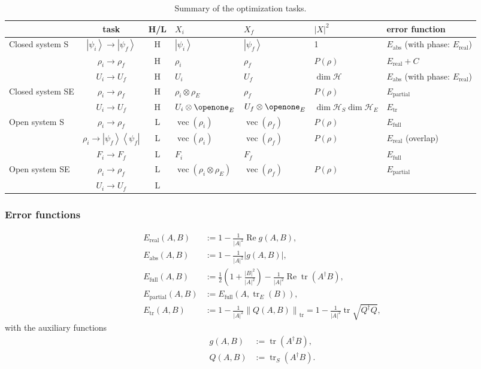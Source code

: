 \documentclass[aps, pra, a4paper, longbibliography]{revtex4}
\newcommand{\I}{\openone}
\newcommand{\ket}[1]{\left| #1 \right \rangle}
\newcommand{\ketbra}[2]{\left| #1 \right \rangle \left \langle #2 \right|}
\newcommand{\hilb}[1]{\mathcal{#1}}
\DeclareMathOperator{\tr}{tr}
\DeclareMathOperator{\re}{Re}
\DeclareMathOperator{\cvec}{vec}
\begin{document}
\begin{table}
\begin{tabular}{l|c|c|l|l|l|l}
& task & H/L & $X_i$ & $X_f$ & $|X|^2$ & error function\\
\hline
Closed system S
& $\ket{\psi_i} \to \ket{\psi_f}$ & H
& $\ket{\psi_i}$ & $\ket{\psi_f}$ & 1 & $E_\text{abs}$ (with phase: $E_\text{real}$)\\
& $\rho_i \to \rho_f$ & H
& $\rho_i$ & $\rho_f$ & $P(\rho)$ & $E_\text{real} + C$\\
& $U_i \to U_f$ & H
& $U_i$ & $U_f$ & $\dim \hilb{H}$ & $E_\text{abs}$ (with phase: $E_\text{real}$)\\
\hline
Closed system SE
& $\rho_i \to \rho_f$ & H
& $\rho_i \otimes \rho_E$ & $\rho_f$ & $P(\rho)$ & $E_\text{partial}$\\
& $U_i \to U_f$ & H
& $U_i \otimes \I_E$ & $U_f \otimes \I_E$ & $\dim \hilb{H}_S \dim \hilb{H}_E$ & $E_\text{tr}$\\
\hline
Open system S
& $\rho_i \to \rho_f$ & L & $\cvec(\rho_i)$ & $\cvec(\rho_f)$ & $P(\rho)$ & $E_\text{full}$\\
& $\rho_i \to \ketbra{\psi_f}{\psi_f}$ & L
& $\cvec(\rho_i)$ & $\cvec(\rho_f)$ & $P(\rho)$ & $E_\text{real}$ (overlap)\\
& $F_i \to F_f$ & L & $F_i$ & $F_f$ & & $E_\text{full}$\\
\hline
Open system SE
& $\rho_i \to \rho_f$ & L
& $\cvec(\rho_i \otimes \rho_E)$ & $\cvec(\rho_f)$ & $P(\rho)$ & $E_\text{partial}$\\
& $U_i \to U_f$ & L
\end{tabular}
\caption{Summary of the optimization tasks.}
\label{table:tasks}
\end{table}


\subsubsection*{Error functions}



\begin{align}
E_\text{real}(A, B) &:= 1 -\frac{1}{|A|^2} \re g(A, B),\\
E_\text{abs}(A, B) &:= 1 -\frac{1}{|A|^2} |g(A, B)|,\\
E_\text{full}(A, B) &:= \frac{1}{2}\left(1 +\frac{|B|^2}{|A|^2}\right) -\frac{1}{|A|^2} \re \tr(A^\dagger B),\\
E_\text{partial}(A, B) &:= E_\text{full}(A, \tr_E(B)),\\
E_\text{tr}(A, B) &:= 1 -\frac{1}{|A|^2} \left\|Q(A, B)\right\|_{\tr}
= 1 -\frac{1}{|A|^2} \tr \sqrt{Q^\dagger Q},
\end{align}
with the auxiliary functions
\begin{align}
g(A, B) &:= \tr(A^\dagger B),\\
Q(A, B) &:= \tr_S\left(A^\dagger B\right).
\end{align}
\end{document}
